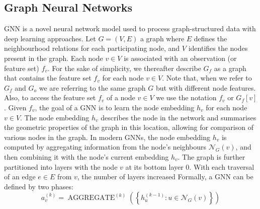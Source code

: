 \documentclass[conference]{IEEEtran}
\begin{document}
\subsection{Graph Neural Networks}
 \ac{GNN} is a novel neural network model used to process graph-structured data with deep learning approaches.
%
Let $G = (V, E)$ a graph  
where $E$ defines the neighbourhood relations for each participating node, 
and $V$ identifies the nodes present in the graph. %
% 
Each node $v \in V$ is associated with an observation (or feature set) $f_v$.
For the sake of simplicity, 
 we thereafter describe $G_f$ as a graph that contains the feature set $f_v$ for each node $v \in V$.
 Note that, when we refer to $G_f$ and $G_o$ we are referring to the same graph $G$ but with different node features.
 Also, to access the feature set $f_v$ of a node $v \in V$ we use the notation $f_v$ or $G_f[v]$.
%
Given $f_v$, %
 the goal of a \ac{GNN} is to learn the node embedding $h_v$ for each node $v \in V$. The node embedding $h_v$ describes the node in the network and summarises the geometric properties of the graph in this location, allowing for comparison of various nodes in the graph.
 In modern \acp{GNN}, the node embedding $h_v$ is computed by aggregating information from the node's neighbours $\mathcal{N}_G(v)$,
  and then combining it with the node's current embedding $h_v$.
 The graph is further partitioned into layers with the node $v$ at its bottom layer $0$. With each traversal of an edge $e \in E$ from $v$, the number of layers increased
Formally, a \ac{GNN} can be defined by two phases:
\begin{equation}
a_{v}^{(k)}=\operatorname{AGGREGATE}^{(k)}\left(\left\{h_{u}^{(k-1)}: u \in \mathcal{N}_G(v)\right\}\right)   
\end{equation}
\end{document}
